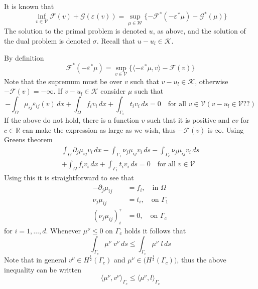 \documentclass[12pt,a4paper]{article}
\numberwithin{equation}{section}
\numberwithin{table}{section}
\numberwithin{figure}{section}
\newcommand{\R}{\ensuremath{\mathbb{R}}}
\newcommand{\W}{\ensuremath{\mathcal{W}}}
\newcommand{\half}{\ensuremath{\frac{1}{2}}}
\newcommand{\pd}[1]{\ensuremath{\partial_{#1}}}
\renewcommand{\dj}{\pd{j}}
\newcommand{\V}{\ensuremath{\mathcal{V}}}
\newcommand{\K}{\ensuremath{\mathcal{K}}}
\newcommand{\F}{\ensuremath{{\mathcal F}}}
\newcommand{\G}{\ensuremath{{\mathcal G}}}
\newcommand{\intO}{\int_\Omega\!\!}
\newcommand{\intG}[1][0]{\int_{\Gamma_{#1}}\!\!}
\renewcommand{\epsilon}{\varepsilon}
\newcommand{\strain}[1][]{\ensuremath{\epsilon_{#1}}}
\newcommand{\epsij}{\strain[ij]}
\providecommand{\dualp}[2]{\langle #1, #2 \rangle}
\newcommand{\infvinV}{\ensuremath{\inf_{v\in \V}}}
\newcommand{\supvinV}{\ensuremath{\sup_{v\in \V}}}
\newcommand{\dx}{{\,dx}}
\newcommand{\ds}{{\,ds}}
\begin{document}
It is known that
\begin{equation}
  \label{eq:PrimalDual}
  \infvinV \F(v) + \G(\strain(v))
  = \sup_{\mu\in \W} \{ - \F^*(-\strain^* \mu) - \G^*(\mu) \}
\end{equation}
The solution to the primal problem is denoted $u$, as above, and the solution of the dual
problem is denoted $\sigma$.  Recall that $u-u_l\in \K$. 

By definition
\begin{equation}
  \F^*(-\strain^* \mu) = \supvinV \{\dualp{-\strain^* \mu}{v} - \F(v) \}
\end{equation}
Note that the supremum must be over $v$ such that $v-u_l \in \K$,
otherwise $-\F(v) = -\infty$.  If $v-u_l\in \K$ consider $\mu$ such that
\begin{equation}
  -\intO \mu_{ij} \epsij(v) \dx + \intO f_i v_i \dx
  + \intG[1] t_i v_i \ds = 0 \quad\text{for all }v\in \V (v-u_l\in \V \text{??})
\end{equation}
If the above do not hold, there is a function $v$ such that it is
positive and $cv$ for $c\in\R$ can make the expression as
large as we wish, thus $-\F(v)$ is $\infty$.  Using Greens theorem
\begin{multline}
  \intO \dj \mu_{ij} v_i \dx - \intG[1] \nu_j \mu_{ij} v_i \ds
  - \intG[c] \nu_j \mu_{ij} v_i \ds  \\
  + \intO f_i v_i \dx
  + \intG[1] t_i v_i \ds = 0 \quad\text{for all } v\in \V 
\end{multline}
Using this it is straightforward to see that
\begin{equation}
  \label{eq:stressEquilibrium}
  \begin{split}
    -\dj \mu_{ij} &= f_i,\quad\text{in }\Omega \\
    \nu_j \mu_{ij} &= t_i,\quad\text{on }\Gamma_1 \\
    (\nu_j \mu_{ij})^\tau_i &= 0,\quad\text{on }\Gamma_c
  \end{split}
\end{equation}
for $i=1,\ldots,d$.  Whenever $\mu^\nu \le 0$ on $\Gamma_c$ holds it follows that
\begin{equation}
  \intG[c] \mu^\nu \;v^\nu \ds
  \le \intG[c] \mu^\nu \;l \ds
\end{equation}
Note that in general $v^\nu \in H^\half(\Gamma_c)$ and $\mu^\nu \in
\bigl(H^\half(\Gamma_c)\bigr)$, thus the above inequality can be written
\begin{equation}
  \dualp{\mu^\nu}{v^\nu}_{\Gamma_c} \le \dualp{\mu^\nu}{l}_{\Gamma_c}
\end{equation}
\end{document}
